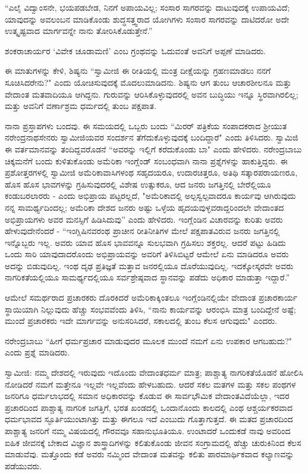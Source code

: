 “ಎಲೈ ವಿದ್ವಾಂಸನೇ, ಭಯಪಡಬೇಡ, ನಿನಗೆ ಅಪಾಯವಿಲ್ಲ; ಸಂಸಾರ ಸಾಗರವನ್ನು ದಾಟುವುದಕ್ಕೆ ಉಪಾಯವಿದೆ; ಯಾವುದನ್ನು ಅವಲಂಬನ ಮಾಡಿಕೊಂಡು ಶುದ್ಧಸತ್ತ್ವರಾದ ಯೋಗಿಗಳು ಸಂಸಾರ ಸಾಗರವನ್ನು ದಾಟಿದರೋ ಅದೇ ಉತ್ಕೃಷ್ಟವಾದ ಮಾರ್ಗವನ್ನೇ ನಾನು ತೋರಿಸಿಕೊಡುತ್ತೇನೆ.”

ಶಂಕರಾಚಾರ್ಯರ ‘ವಿವೇಕ ಚೂಡಾಮಣಿ’ ಎಂಬ ಗ್ರಂಥವನ್ನು ಓದುವಂತೆ ಅವನಿಗೆ ಅಪ್ಪಣೆ ಮಾಡಿದರು.

ಈ ಮಾತುಗಳನ್ನು ಕೇಳಿ, ಶಿಷ್ಯನು “ಸ್ವಾಮೀಜಿ ಈ ರೀತಿಯಲ್ಲಿ ಮಂತ್ರ ದೀಕ್ಷೆಯನ್ನು ಗ್ರಹಣಮಾಡಲು ನನಗೆ ಸೂಚಿಸಿದರೇನು?" ಎಂದು ಯೋಚಿಸುವುದಕ್ಕೆ ಮೊದಲುಮಾಡಿದನು. ಶಿಷ್ಯನು ಆಗ ತುಂಬ ಆಚಾರಶೀಲನೂ ಮತ್ತು ವೇದಾಂತ ಮತವಾದಿಯೂ ಆಗಿದ್ದನು. ಗುರುವನ್ನು ಆರಿಸಿಕೊಳ್ಳುವುದರಲ್ಲಿ ಅವನ ಬುದ್ಧಿಯು ಇನ್ನೂ ಸ್ಥಿರವಾಗಿರಲಿಲ್ಲ; ಮತ್ತು ಅವನಿಗೆ ವರ್ಣಾಶ್ರಮ ಧರ್ಮದಲ್ಲಿ ತುಂಬ ಪಕ್ಷಪಾತ.

ನಾನಾ ಪ್ರಸ್ತಾಪಗಳು ಬಂದವು. ಈ ಸಮಯದಲ್ಲಿ ಒಬ್ಬರು ಬಂದು “ಮಿರರ್ ಪತ್ರಿಕೆಯ ಸಂಪಾದಕರಾದ ಶ‍್ರೀಯುತ ನರೇಂದ್ರನಾಥಸೇನರು ಸ್ವಾಮೀಜಿಯವರ ಸಂದರ್ಶನ ತೆಗೆದುಕೊಳ್ಳುವುದಕ್ಕೆ ಬಂದಿದ್ದಾರೆ" ಎಂದು ತಿಳಿಸಿದರು. ಸ್ವಾಮಿಜಿ ಈ ವರ್ತಮಾನವನ್ನು ತಂದಿದ್ದವರೊಡನೆ “ಅವರನ್ನು ಇಲ್ಲಿಗೆ ಕರೆದುಕೊಂಡು ಬಾ" ಎಂದು ಹೇಳಿದರು. ನರೇಂದ್ರಬಾಬು ಚಿಕ್ಕಮನೆಗೆ ಬಂದು ಕುಳಿತುಕೊಂಡು ಅಮೆರಿಕಾ ಇಂಗ್ಲೆಂಡ್ ಸಂಬಂಧವಾಗಿ ನಾನಾ ಪ್ರಶ್ನೆಗಳನ್ನು ಹಾಕುತ್ತಿದ್ದರು. ಈ ಪ್ರಶೋತ್ತರಗಳಲ್ಲಿ ಸ್ವಾಮೀಜಿ ಅಮೆರಿಕಾವಾಸಿಗಳಂಥ ಸಹೃದಯರೂ, ಉದಾರಚಿತ್ತರೂ, ಅತಿಥಿ ಸತ್ಕಾರ\break ಪರಾಯಣರೂ, ಹೊಸ ಹೊಸ ಭಾವಗಳನ್ನು ಗ್ರಹಿಸುವುದರಲ್ಲಿ ವಿಶೇಷ ಉತ್ಸುಕರೂ, ಆದ ಜನರು ಜಗತ್ತಿನಲ್ಲಿ ಬೇರೆಲ್ಲಿಯೂ ಕಂಡುಬರಲಾರರು - ಎಂದು ಅಭಿಪ್ರಾಯ ಪಟ್ಟರಲ್ಲದೆ, "ಅಮೆರಿಕಾದಲ್ಲಿ ಅಲ್ಪಸ್ವಲ್ಪವಾದರೂ ಕಾರ್ಯವು ಆಗಿರುವುದು ನನ್ನ ಸಾಮರ್ಥ್ಯದಿಂದಲ್ಲ; ಅಮೆರಿಕಾ ದೇಶದ ಜನರು ಅಷ್ಟು ಒಳ್ಳೆಯ ಹೃದಯವುಳ್ಳವರಾದ್ದರಿಂದಲೇ ವೇದಾಂತದ ಅಭಿಪ್ರಾಯಗಳು ಅವರ ಮನಸ್ಸಿಗೆ ಹಿಡಿಸಿದುವು'' ಎಂದು ಹೇಳಿದರು. ಇಂಗ್ಲೆಂಡಿನ ವಿಚಾರವನ್ನು ಕುರಿತು ಅವರು ಹೇಳುವುದೇನೆಂದರೆ - “ಇಂಗ್ಲಿಷಿನವರಂಥ ಪ್ರಾಚೀನ ರೀತಿನೀತಿಗಳ ಮೇಲೆ ಪಕ್ಷಪಾತವಿರುವ ಜನರು ಜಗತ್ತಿನಲ್ಲಿ ಇನ್ನೊಬ್ಬರು ಇಲ್ಲ. ಅವರು ಯಾವ ಹೊಸ ಭಾವವನ್ನೂ ಸುಲಭವಾಗಿ ಗ್ರಹಿಸಲು ಶಕ್ತರಲ್ಲ. ಆದರೆ ಪಟ್ಟು ಹಿಡಿದು ಒಂದು ಸಾರಿ ಯಾವುದಾದರೊಂದು ಅಭಿಪ್ರಾಯವನ್ನು ಅವರಿಗೆ ತಿಳಿಸಿಬಿಟ್ಟರೆ ಆಮೇಲೆ ಏನು ಮಾಡಿದರೂ ಅವರು ಅದನ್ನು ಬಿಡುವುದಿಲ್ಲ. ಇಂಥ ದೃಢ ಪ್ರತಿಜ್ಞತೆ ಮತ್ತಾವ ಜನರಲ್ಲಿಯೂ ದೊರೆಯುವುದಿಲ್ಲ. ಇದಕ್ಕೋಸ್ಕರವೇ ಅವರು ನಾಗರಿಕತೆಯಲ್ಲಿಯೂ ಸಾಮರ್ಥ್ಯದಲ್ಲಿಯೂ ಸರ್ವಶ್ರೇಷ್ಠವಾದ ಸ್ಥಾನವನ್ನು ಪಡೆದು ಅಧಿಕಾರ ಮಾಡುತ್ತಾ ಇದ್ದಾರೆ.”

ಆಮೇಲೆ ಸಮರ್ಥರಾದ ಪ್ರಚಾರಕರು ದೊರಕಿದರೆ ಅಮೆರಿಕಾಕ್ಕಿಂತಲೂ ಇಂಗ್ಲೆಂಡಿನಲ್ಲಿಯೇ ವೇದಾಂತ ಪ್ರಚಾರಕಾರ್ಯ ಸ್ಥಾಯಿಯಾಗಿ ನಿಲ್ಲುವುದು ಹೆಚ್ಚು ಸಂಭವವೆಂದು ತಿಳಿಸಿ, “ನಾನು ಕಾರ್ಯವನ್ನು ಆರಂಭಿಸಿ ಮಾತ್ರ ಬಂದಿದ್ದೇನೆ ಅಷ್ಟೆ; ಮುಂದೆ ಪ್ರಚಾರಕರು ಇದೇ ಮಾರ್ಗವನ್ನು ಅನುಸರಿಸಿದರೆ, ಸಕಾಲದಲ್ಲಿ ತುಂಬ ಕೆಲಸ ಆಗುವುದು" ಎಂದರು.

ನರೇಂದ್ರಬಾಬು “ಹೀಗೆ ಧರ್ಮಪ್ರಚಾರ ಮಾಡುವುದರ ಮೂಲಕ ಮುಂದೆ ನಮಗೆ ಏನು ಉಪಕಾರ ಆಗಬಹುದು?" ಎಂದು ಪ್ರಶ್ನೆ ಮಾಡಿದರು.

ಸ್ವಾಮೀಜಿ: ನಮ್ಮ ದೇಶದಲ್ಲಿ ಇರುವುದು ಇದೊಂದು ವೇದಾಂತಧರ್ಮ ಮಾತ್ರ; ಪಾಶ್ಚಾತ್ಯ ನಾಗರಿಕತೆಯೊಡನೆ ಹೋಲಿಸಿ ನೋಡಿದರೆ ನಮಗೆ ಮತ್ತೇನೂ ಇಲ್ಲವೇ ಇಲ್ಲವೆಂದು ಹೇಳಬಹುದು. ಆದರೆ ಸಕಲ ಮತಗಳ ಮತ್ತು ಸಕಲ ಪಂಥಗಳ ಜನರಿಗೂ ಧರ್ಮಲಾಭದಲ್ಲಿ ಸಮಾನ ಅಧಿಕಾರವನ್ನು ಕೊಡುವ ಈ ಸಾರ್ವಭೌಮಿಕ ವೇದಾಂತವಿದೆಯೆಲ್ಲಾ, ಇದರ ಪ್ರಚಾರದಿಂದ ಪಾಶ್ಚಾತ್ಯ ನಾಗರಿಕ ಜಗತ್ತಿಗೆ, ಭರತ ಖಂಡದಲ್ಲಿ ಒಂದಾನೊಂದು ಕಾಲದಲ್ಲಿ ಎಂಥ ಆಶ್ಚರ್ಯಕರವಾದ ಧರ್ಮಭಾವದ ಸ್ಫೂರ್ತಿಯುಂಟಾಗಿತ್ತು ಮತ್ತು ಈಗಲೂ ಇದೆ ಎಂಬುದು ಗೊತ್ತಾಗುತ್ತದೆ. ಈ ಮತದ ಪ್ರಚಾರದಿಂದ ಪಾಶ್ಚಾತ್ಯ ಜನರಿಗೆ ನಮ್ಮ ವಿಷಯದಲ್ಲಿ ಗೌರವವೂ ಸಹಾನುಭೂತಿಯೂ. ಉಂಟಾದರೆ ಒಂದುಕಡೆ ನಾವು ಅವರಿಂದ ಐಹಿಕ ಜೀವನಕ್ಕೆ ಬೇಕಾದ ವಿಜ್ಞಾನ ಶಾಸ್ತ್ರಾದಿಗಳನ್ನು ಕಲಿತುಕೊಂಡು ಜೀವನ ಸಂಗ್ರಾಮದಲ್ಲಿ ಹೆಚ್ಚು ಚುರುಕಿನಿಂದ ಕೆಲಸ ಮಾಡುವೆವು. ಮತ್ತೊಂದು ಕಡೆ ಅವರು ನಮ್ಮಿಂದ ವೇದಾಂತ ಮತವನ್ನು ಕಲಿತು ಪಾರಮಾರ್ಥಿಕವಾದ ಕಲ್ಯಾಣವನ್ನು ಪಡೆಯುವರು.

